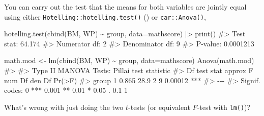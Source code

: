\documentclass[
  letterpaper,
  10pt,
  krantz2]{krantz}
\makeatletter
\newenvironment{Shaded}{\begin{snugshade}}{\end{snugshade}}
\newcommand{\AttributeTok}[1]{\textcolor[rgb]{0.40,0.45,0.13}{#1}}
\newcommand{\CommentTok}[1]{\textcolor[rgb]{0.37,0.37,0.37}{#1}}
\newcommand{\FunctionTok}[1]{\textcolor[rgb]{0.28,0.35,0.67}{#1}}
\newcommand{\NormalTok}[1]{\textcolor[rgb]{0.00,0.23,0.31}{#1}}
\newcommand{\OtherTok}[1]{\textcolor[rgb]{0.00,0.23,0.31}{#1}}
\newcommand{\SpecialCharTok}[1]{\textcolor[rgb]{0.37,0.37,0.37}{#1}}
\newenvironment{kframe}{%
  \medskip{}
  \setlength{\fboxsep}{.8em}
  \def\at@end@of@kframe{}%
  \ifinner\ifhmode%
  \def\at@end@of@kframe{\end{minipage}}%
  \begin{minipage}{\columnwidth}%
  \fi\fi%
  \def\FrameCommand##1{\hskip\@totalleftmargin \hskip-\fboxsep
  \colorbox{shadecolor}{##1}\hskip-\fboxsep
      \hskip-\linewidth \hskip-\@totalleftmargin \hskip\columnwidth}%
  \MakeFramed {\advance\hsize-\width
    \@totalleftmargin\z@ \linewidth\hsize
    \@setminipage}}%
{\par\unskip\endMakeFramed%
  \at@end@of@kframe}
\renewenvironment{Shaded}{\begin{kframe}}{\end{kframe}}
\makeatother
\begin{document}
You can carry out the test that the means for both variables are jointly
equal using either \texttt{Hotelling::hotelling.test()}
() or
\texttt{car::Anova()},

\begin{Shaded}
\begin{Highlighting}[]
\FunctionTok{hotelling.test}\NormalTok{(}\FunctionTok{cbind}\NormalTok{(BM, WP) }\SpecialCharTok{\textasciitilde{}}\NormalTok{ group, }\AttributeTok{data=}\NormalTok{mathscore) }\SpecialCharTok{|\textgreater{}} \FunctionTok{print}\NormalTok{()}
\CommentTok{\#\textgreater{} Test stat:  64.174 }
\CommentTok{\#\textgreater{} Numerator df:  2 }
\CommentTok{\#\textgreater{} Denominator df:  9 }
\CommentTok{\#\textgreater{} P{-}value:  0.0001213}

\NormalTok{math.mod }\OtherTok{\textless{}{-}} \FunctionTok{lm}\NormalTok{(}\FunctionTok{cbind}\NormalTok{(BM, WP) }\SpecialCharTok{\textasciitilde{}}\NormalTok{ group, }\AttributeTok{data=}\NormalTok{mathscore)}
\FunctionTok{Anova}\NormalTok{(math.mod)}
\CommentTok{\#\textgreater{} }
\CommentTok{\#\textgreater{} Type II MANOVA Tests: Pillai test statistic}
\CommentTok{\#\textgreater{}       Df test stat approx F num Df den Df  Pr(\textgreater{}F)    }
\CommentTok{\#\textgreater{} group  1     0.865     28.9      2      9 0.00012 ***}
\CommentTok{\#\textgreater{} {-}{-}{-}}
\CommentTok{\#\textgreater{} Signif. codes:  0 \textquotesingle{}***\textquotesingle{} 0.001 \textquotesingle{}**\textquotesingle{} 0.01 \textquotesingle{}*\textquotesingle{} 0.05 \textquotesingle{}.\textquotesingle{} 0.1 \textquotesingle{} \textquotesingle{} 1}
\end{Highlighting}
\end{Shaded}

What's wrong with just doing the two \(t\)-tests (or equivalent
\(F\)-test with \texttt{lm()})?
\end{document}

